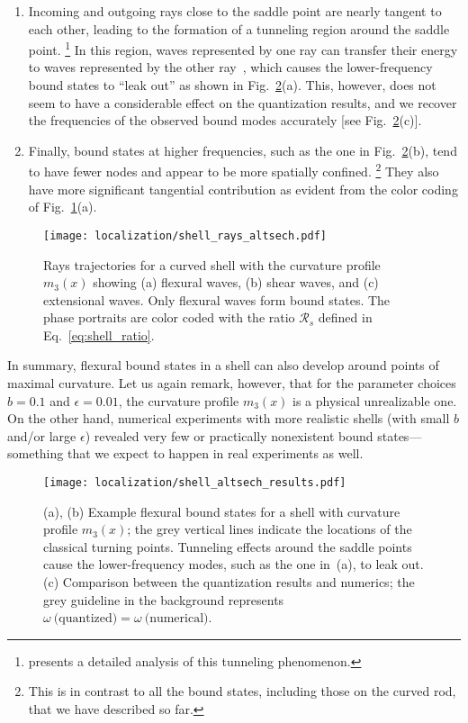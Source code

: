 \begin{enumerate}
  \item Incoming and outgoing rays close to the saddle point are nearly tangent to each other, leading to the formation of a tunneling region around the saddle point.%
    \footnote{\citet{mohammed2021} presents a detailed analysis of this tunneling phenomenon.}
    In this region, waves represented by one ray can transfer their energy to waves represented by the other ray~\cite{tracy2014}, which causes the lower-frequency bound states to ``leak out'' as shown in Fig.~\ref{fig:shell_m3_results}(a).
    This, however, does not seem to have a considerable effect on the quantization results, and we recover the frequencies of the observed bound modes accurately [see Fig.~\ref{fig:shell_m3_results}(c)].
  \item Finally, bound states at higher frequencies, such as the one in Fig.~\ref{fig:shell_m3_results}(b), tend to have fewer nodes and appear to be more spatially confined.%
    \footnote{This is in contrast to all the bound states, including those on the curved rod, that we have described so far.}
    They also have more significant tangential contribution as evident from the color coding of Fig.~\ref{fig:shell_m3_rays}(a).
\end{enumerate}
%
\begin{figure}
  \begin{center}
    \texttt{[image: localization/shell\_rays\_altsech.pdf]}
  \end{center}
  \caption{%
    Rays trajectories for a curved shell with the curvature profile $m_{3}(x)$ showing (a) flexural waves, (b) shear waves, and (c) extensional waves.
    Only flexural waves form bound states.
    The phase portraits are color coded with the ratio $\mathscr{R}_{s}$ defined in Eq.~\eqref{eq:shell_ratio}.
  }
  \label{fig:shell_m3_rays}
\end{figure}

In summary, flexural bound states in a shell can also develop around points of maximal curvature.
Let us again remark, however, that for the parameter choices $b = 0.1$ and $\epsilon = 0.01$, the curvature profile $m_{3}(x)$ is a physical unrealizable one.
On the other hand, numerical experiments with more realistic shells (with small $b$ and/or large $\epsilon$) revealed very few or practically nonexistent bound states---something that we expect to happen in real experiments as well.

\begin{figure}
  \begin{center}
    \texttt{[image: localization/shell\_altsech\_results.pdf]}
  \end{center}
  \caption{%
    (a), (b) Example flexural bound states for a shell with curvature profile $m_{3}(x)$; the grey vertical lines indicate the locations of the classical turning points.
    Tunneling effects around the saddle points cause the lower-frequency modes, such as the one in~(a), to leak out.
    (c) Comparison between the quantization results and numerics; the grey guideline in the background represents $\omega~\text{(quantized)} = \omega~\text{(numerical)}$.
  }
  \label{fig:shell_m3_results}
\end{figure}


